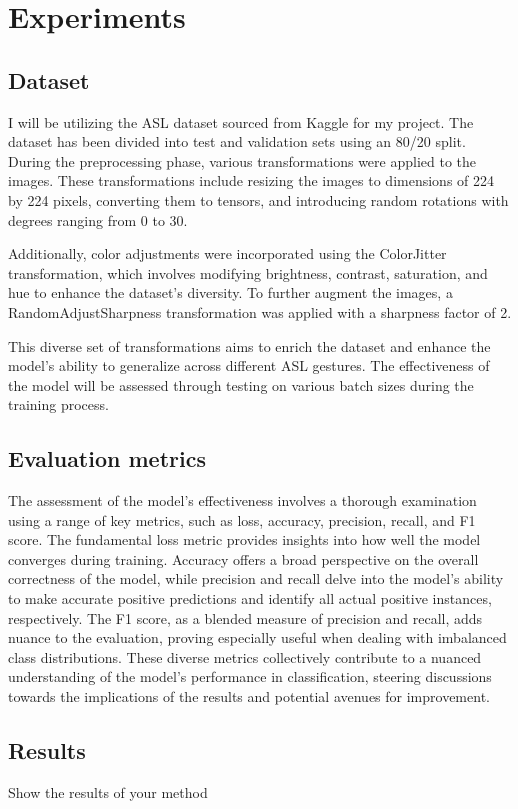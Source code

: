 \documentclass{article}
\begin{document}
\section{Experiments}

\subsection{Dataset}
I will be utilizing the ASL dataset sourced from Kaggle for my project. The dataset has been divided into test and validation sets using an 80/20 split. During the preprocessing phase, various transformations were applied to the images. These transformations include resizing the images to dimensions of 224 by 224 pixels, converting them to tensors, and introducing random rotations with degrees ranging from 0 to 30.

Additionally, color adjustments were incorporated using the ColorJitter transformation, which involves modifying brightness, contrast, saturation, and hue to enhance the dataset's diversity. To further augment the images, a RandomAdjustSharpness transformation was applied with a sharpness factor of 2.

This diverse set of transformations aims to enrich the dataset and enhance the model's ability to generalize across different ASL gestures. The effectiveness of the model will be assessed through testing on various batch sizes during the training process.
\subsection{Evaluation metrics}
The assessment of the model's effectiveness involves a thorough examination using a range of key metrics, such as loss, accuracy, precision, recall, and F1 score. The fundamental loss metric provides insights into how well the model converges during training. Accuracy offers a broad perspective on the overall correctness of the model, while precision and recall delve into the model's ability to make accurate positive predictions and identify all actual positive instances, respectively. The F1 score, as a blended measure of precision and recall, adds nuance to the evaluation, proving especially useful when dealing with imbalanced class distributions. These diverse metrics collectively contribute to a nuanced understanding of the model's performance in classification, steering discussions towards the implications of the results and potential avenues for improvement.
\subsection{Results}
Show the results of your method
\end{document}
